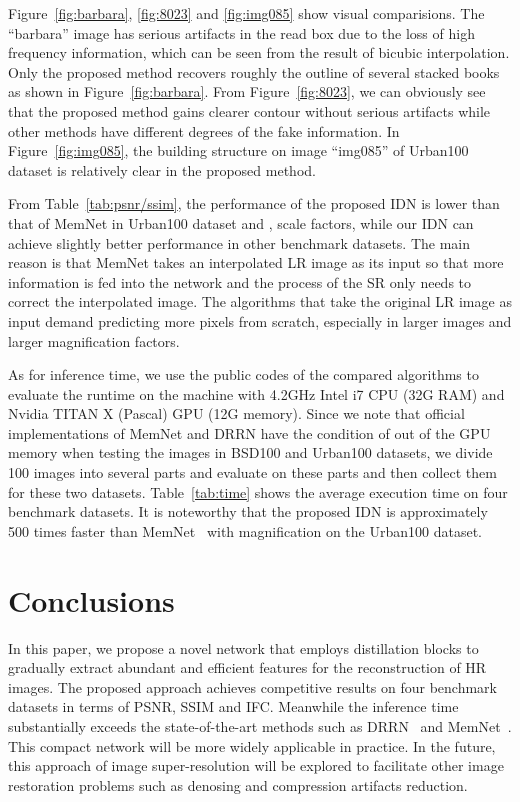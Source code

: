 \documentclass[10pt,twocolumn,letterpaper]{article}
\begin{document}
Figure~\ref{fig:barbara}, \ref{fig:8023} and \ref{fig:img085} show visual comparisions. The ``barbara'' image has serious artifacts in the read box due to the loss of high frequency information, which can be seen from the result of bicubic interpolation. Only the proposed method recovers roughly the outline of several stacked books as shown in Figure~\ref{fig:barbara}. From Figure~\ref{fig:8023}, we can obviously see that the proposed method gains clearer contour without serious artifacts while other methods have different degrees of the fake information. In Figure~\ref{fig:img085}, the building structure on image ``img085'' of Urban100 dataset is relatively clear in the proposed method.

From Table~\ref{tab:psnr/ssim}, the performance of the proposed IDN is lower than that of MemNet in Urban100 dataset and ,  scale factors, while our IDN can achieve slightly better performance in other benchmark datasets. The main reason is that MemNet takes an interpolated LR image as its input so that more information is fed into the network and the process of the SR only needs to correct the interpolated image. The algorithms that take the original LR image as input demand predicting more pixels from scratch, especially in larger images and larger magnification factors.


As for inference time, we use the public codes of the compared algorithms to evaluate the runtime on the machine with 4.2GHz Intel i7 CPU (32G RAM) and Nvidia TITAN X (Pascal) GPU (12G memory). Since we note that official implementations of MemNet and DRRN have the condition of out of the GPU memory when testing the images in BSD100 and Urban100 datasets, we divide 100 images into several parts and evaluate on these parts and then collect them for these two datasets. Table~\ref{tab:time} shows the average execution time on four benchmark datasets. It is noteworthy that the proposed IDN is approximately 500 times faster than MemNet~\cite{MemNet} with  magnification on the Urban100 dataset.

\section{Conclusions}
In this paper, we propose a novel network that employs distillation blocks to gradually extract abundant and efficient features for the reconstruction of HR images. The proposed approach achieves competitive results on four benchmark datasets in terms of PSNR, SSIM and IFC. Meanwhile the inference time substantially exceeds the state-of-the-art methods such as DRRN~\cite{DRRN} and MemNet~\cite{MemNet}. This compact network will be more widely applicable in practice. In the future, this approach of image super-resolution will be explored to facilitate other image restoration problems such as denosing and compression artifacts reduction.

{\small


}
\end{document}
